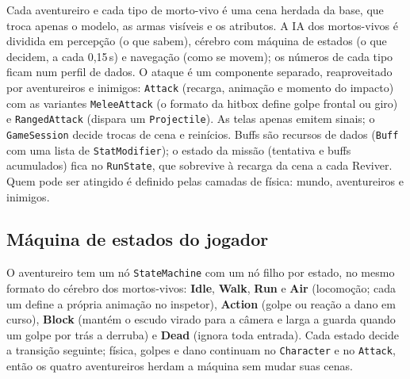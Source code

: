 \documentclass[11pt,a4paper]{article}
\begin{document}
\begin{center}
\end{center}

Cada aventureiro e cada tipo de morto-vivo é uma cena herdada da base, que troca apenas o modelo, as armas visíveis e os atributos. A IA dos mortos-vivos é dividida em percepção (o que sabem), cérebro com máquina de estados (o que decidem, a cada 0,15\,s) e navegação (como se movem); os números de cada tipo ficam num perfil de dados. O ataque é um componente separado, reaproveitado por aventureiros e inimigos: \texttt{Attack} (recarga, animação e momento do impacto) com as variantes \texttt{MeleeAttack} (o formato da hitbox define golpe frontal ou giro) e \texttt{RangedAttack} (dispara um \texttt{Projectile}). As telas apenas emitem sinais; o \texttt{GameSession} decide trocas de cena e reinícios. Buffs são recursos de dados (\texttt{Buff} com uma lista de \texttt{StatModifier}); o estado da missão (tentativa e buffs acumulados) fica no \texttt{RunState}, que sobrevive à recarga da cena a cada Reviver. Quem pode ser atingido é definido pelas camadas de física: mundo, aventureiros e inimigos.

\subsection{Máquina de estados do jogador}

O aventureiro tem um nó \texttt{StateMachine} com um nó filho por estado, no mesmo formato do cérebro dos mortos-vivos: \textbf{Idle}, \textbf{Walk}, \textbf{Run} e \textbf{Air} (locomoção; cada um define a própria animação no inspetor), \textbf{Action} (golpe ou reação a dano em curso), \textbf{Block} (mantém o escudo virado para a câmera e larga a guarda quando um golpe por trás a derruba) e \textbf{Dead} (ignora toda entrada). Cada estado decide a transição seguinte; física, golpes e dano continuam no \texttt{Character} e no \texttt{Attack}, então os quatro aventureiros herdam a máquina sem mudar suas cenas.
\end{document}
